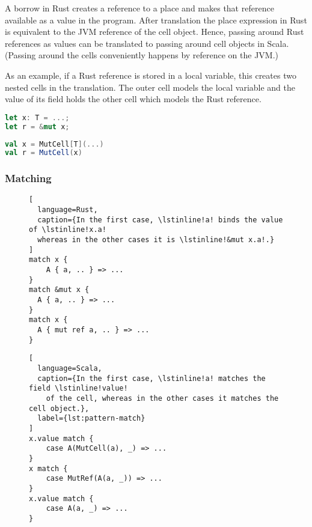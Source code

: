 A borrow in Rust creates a reference to a place and makes that reference
available as a value in the program. After translation the place expression in
Rust is equivalent to the JVM reference of the cell object. Hence, passing
around Rust references as values can be translated to passing around cell
objects in Scala. (Passing around the cells conveniently happens by reference on
the JVM.)

As an example, if a Rust reference is stored in a local variable, this creates
two nested cells in the translation. The outer cell models the local variable
and the value of its field holds the other cell which models the Rust reference.

\noindent\begin{minipage}[t]{.45\textwidth}
\begin{lstlisting}[language=Rust]
let x: T = ...;
let r = &mut x;
\end{lstlisting}
\end{minipage}\hfill
\begin{minipage}[t]{.45\textwidth}
\begin{lstlisting}[language=Scala]
val x = MutCell[T](...)
val r = MutCell(x)
\end{lstlisting}
\end{minipage}

\subsubsection{Matching}

\begin{figure}
\noindent\begin{minipage}[t]{.45\textwidth}
\begin{lstlisting}[
  language=Rust,
  caption={In the first case, \lstinline!a! binds the value of \lstinline!x.a!
  whereas in the other cases it is \lstinline!&mut x.a!.}
]
match x {
    A { a, .. } => ...
}
match &mut x {
  A { a, .. } => ...
}
match x {
  A { mut ref a, .. } => ...
}
\end{lstlisting}
\end{minipage}\hfill
\begin{minipage}[t]{.45\textwidth}
\begin{lstlisting}[
  language=Scala,
  caption={In the first case, \lstinline!a! matches the field \lstinline!value!
    of the cell, whereas in the other cases it matches the cell object.},
  label={lst:pattern-match}
]
x.value match {
    case A(MutCell(a), _) => ...
}
x match {
    case MutRef(A(a, _)) => ...
}
x.value match {
    case A(a, _) => ...
}
\end{lstlisting}
\end{minipage}
\end{figure}

